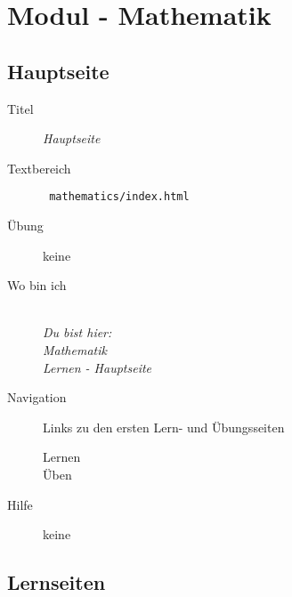 \chapter{ Modul - Mathematik }
\label{cha:math-module}

\section{ Hauptseite }
\label{cha:math-module-mainpage}
\begin{description}
  \item[Titel] \emph{ Hauptseite }
  \item[Textbereich] \texttt{ mathematics/index.html }
  \item[Übung] keine
  \item[Wo bin ich] \emph{\\Du bist hier:\\Mathematik\\Lernen - Hauptseite}
  \item[Navigation] Links zu den ersten Lern- und Übungsseiten
  \begin{description}
    \item[Lernen] 
    \item[Üben] 
  \end{description}
  \item[Hilfe] keine
\end{description}



\section{ Lernseiten }

